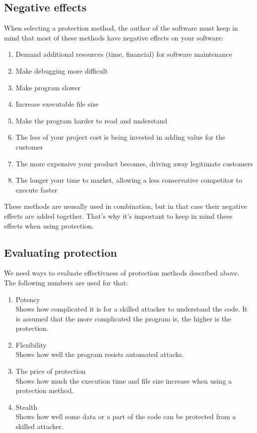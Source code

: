 \documentclass[a4paper,12pt]{article}
\begin{document}
\subsection{Negative effects}
When selecting a protection method, the author of the software must keep
in mind that most of these methods have negative effects on your software:
\begin{enumerate}
\item Demand additional resources (time, financial) for software maintenance
\item Make debugging more difficult
\item Make program slower
\item Increase executable file size
\item Make the program harder to read and understand
\item The less of your project cost is being invested in adding value for the
    customer
\item The more expensive your product becomes, driving away legitimate
    customers
\item The longer your time to market, allowing a less conservative competitor
    to execute faster
\end{enumerate}

These methods are ususally used in combination, but in that case their
negative effects are added together. That's why it's important to keep in
mind these effects when using protection.

\subsection{Evaluating protection}
We need ways to evaluate effectivness of protection methods described
above. The following numbers are used for that:
\begin{enumerate}
\item Potency\\
    Shows how complicated it is for a skilled attacker to understand the code.
    It is assumed that the more complicated the program is, the higher is the
    protection.
\item Flexibility\\
    Shows how well the program resists automated attacks.
\item The price of protection\\
    Shows how much the execution time and file size increase when using a
    protection method.
\item Stealth\\
    Shows how well some data or a part of the code can be protected from a
    skilled attacker.
\end{enumerate}
\end{document}
